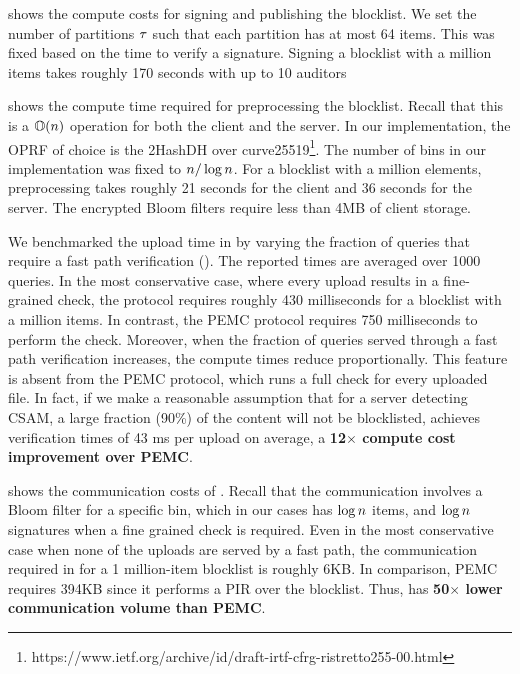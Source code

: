 %
 shows the compute costs for signing and publishing the blocklist. We set the number of partitions $\tau$ such that each partition has at most 64 items. This  was fixed based on the time to verify a signature. Signing a blocklist with a million items takes roughly 170 seconds with up to 10 auditors


%
 shows the compute time required for preprocessing the blocklist. Recall that this is a $\mathbb{O}(n)$ operation for both the client and the server. In our implementation, the OPRF of choice is the 2HashDH over curve25519\footnote{https://www.ietf.org/archive/id/draft-irtf-cfrg-ristretto255-00.html}. The number of bins in our implementation was fixed to $n/\log n$. For a blocklist with a million elements, preprocessing takes roughly 21 seconds for the client and 36 seconds for the server. The encrypted Bloom filters require less than 4MB of client storage.

%
We benchmarked the upload time in \protocolEM by varying the fraction of queries that require a fast path verification (). The reported times are averaged over 1000 queries. In the most conservative case, where every upload results in a fine-grained check, the protocol requires roughly 430 milliseconds for a blocklist with a million items. In contrast, the PEMC protocol requires 750 milliseconds to perform the check. Moreover, when the fraction of queries served through a fast path verification increases, the compute times reduce proportionally. This feature is absent from the PEMC protocol, which runs a full check for every uploaded file. In fact, if we make a reasonable assumption that for a server detecting CSAM, a large fraction (90\%) of the content will not be blocklisted, \protocolEM achieves verification times of 43 ms per upload on average, a \textbf{12$\times$ compute cost improvement over PEMC}. 

 shows the communication costs of \protocolEM. Recall that the communication involves a Bloom filter for a specific bin, which in our cases has $\log n$ items, and $\log n$ signatures when a fine grained check is required. Even in the most conservative case when none of the uploads are served by a fast path, the communication required in \protocolEM for a 1 million-item blocklist is roughly 6KB. In comparison, PEMC requires 394KB since it performs a PIR over the blocklist. Thus, \protocolEM has \textbf{50$\times$ lower communication volume than PEMC}. 



